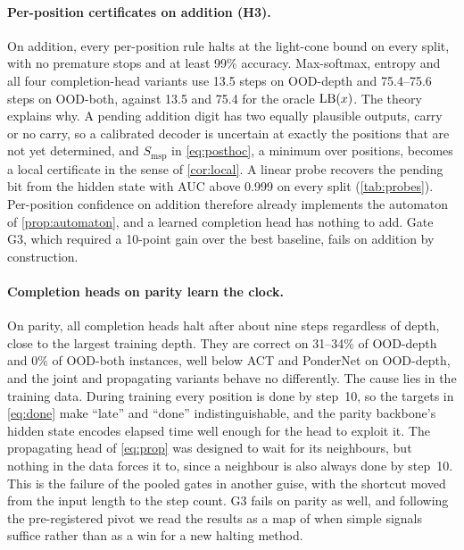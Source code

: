 \paragraph{Per-position certificates on addition (H3).} On addition, every per-position rule halts at
the light-cone bound on every split, with no premature stops and at least 99\% accuracy. Max-softmax,
entropy and all four completion-head variants use 13.5 steps on OOD-depth and 75.4--75.6 steps on
OOD-both, against 13.5 and 75.4 for the oracle $\operatorname{LB}(x)$. The theory explains why. A pending addition
digit has two equally plausible outputs, carry or no carry, so a calibrated decoder is uncertain at
exactly the positions that are not yet determined, and $S_{\mathrm{msp}}$ in \cref{eq:posthoc}, a
minimum over positions, becomes a local certificate in the sense of \cref{cor:local}. A linear probe
recovers the pending bit from the hidden state with AUC above 0.999 on every split (\cref{tab:probes}).
Per-position confidence on addition therefore already implements the automaton of
\cref{prop:automaton}, and a learned completion head has nothing to add. Gate G3, which required a
10-point gain over the best baseline, fails on addition by construction.

\paragraph{Completion heads on parity learn the clock.} On parity, all completion heads halt after
about nine steps regardless of depth, close to the largest training depth. They are correct on 31--34\%
of OOD-depth and 0\% of OOD-both instances, well below ACT and PonderNet on OOD-depth, and the joint and
propagating variants behave no differently. The cause lies in the training data. During training every
position is done by step~10, so the targets in \cref{eq:done} make ``late'' and ``done''
indistinguishable, and the parity backbone's hidden state encodes elapsed time well enough for the head
to exploit it. The propagating head of \cref{eq:prop} was designed to wait for its neighbours, but
nothing in the data forces it to, since a neighbour is also always done by step~10. This is the failure
of the pooled gates in another guise, with the shortcut moved from the input length to the step count.
G3 fails on parity as well, and following the pre-registered pivot we read the results as a map of when
simple signals suffice rather than as a win for a new halting method.

